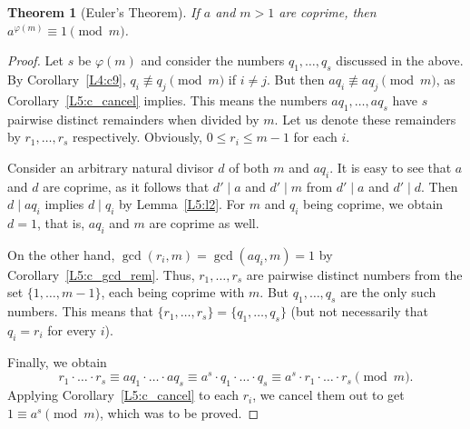 \documentclass[12pt,notitlepage]{article}
\theoremstyle{plain}
\newtheorem{thm}{Theorem}[section]
\theoremstyle{definition}
\theoremstyle{plain}
\renewcommand{\phi}{\varphi}
\newcommand{\1}{\mathbf{1}}
\newcommand{\0}{\mathbf{0}}
\newcommand{\dvd}{\mathop{\mid}}
\begin{document}
\begin{thm}[Euler's Theorem]
If $a$ and $m > 1$ are coprime, then $a^{\phi(m)} \equiv 1 \pmod m$.
\end{thm}
\begin{proof}
Let $s$ be $\phi(m)$ and consider the numbers $q_1, \ldots, q_s$ discussed in the above. By Corollary~\ref{L4:c9}, $q_i \not\equiv q_j \pmod m$ if $i \neq j$. But then $a q_i \not\equiv a q_j \pmod m$, as Corollary~\ref{L5:c_cancel} implies. This means the numbers $a q_1, \ldots, a q_s$ have $s$ pairwise distinct remainders when divided by $m$. Let us denote these remainders by $r_1,\ldots, r_s$ respectively. Obviously, $0 \leq r_i \leq m - 1$ for each $i$.

Consider an arbitrary natural divisor $d$ of both $m$ and $a q_i$. It is easy to see that $a$ and $d$ are coprime, as it follows that $d' \dvd a$ and $d' \dvd m$ from $d' \dvd  a$ and $d' \dvd d$. Then $d \dvd a q_i$ implies $d \dvd q_i$ by Lemma~\ref{L5:l2}. For $m$ and $q_i$ being coprime, we obtain $d = 1$, that is, $a q_i$ and $m$ are coprime as well. 

On the other hand, $\gcd(r_i, m) = \gcd(a q_i, m) = 1$ by Corollary~\ref{L5:c_gcd_rem}. Thus, $r_1, \ldots, r_s$ are pairwise distinct numbers from the set $\{1,\ldots, m-1\}$, each being coprime with $m$. But $q_1, \ldots, q_s$ are the only such numbers. This means that $\{r_1, \ldots, r_s \} = \{q_1, \ldots, q_s\}$ (but not necessarily that $q_i = r_i$ for every $i$).

Finally, we obtain
$$r_1\cdot \ldots \cdot r_s \equiv a q_1 \cdot \ldots \cdot a q_s \equiv a^s \cdot q_1 \cdot \ldots \cdot q_s \equiv a^s \cdot r_1 \cdot \ldots \cdot r_s \pmod m.$$
Applying Corollary~\ref{L5:c_cancel} to each $r_i$, we cancel them out to get $1 \equiv a^s \pmod m$, which was to be proved.
\end{proof}
\end{document}
